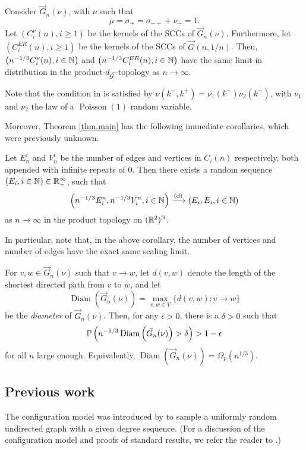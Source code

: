 \begin{theorem}\label{thm.erdosrenyi}
Consider $\vec{G}_n(\nu)$, with $\nu$ such that $$\mu=\sigma_+=\sigma_{-+}+\nu_-=1.$$ 
Let $(C^\nu_i(n), i\geq 1)$ be the kernels of the SCCs of $\vec{G}_n(\nu)$. Furthermore, let $(C^{ER}_i(n), i\geq 1)$ be the kernels of the SCCs of $\vec{G}(n,1/n)$. Then, $\left(n^{-1/3}C^\nu_i(n),i\in \N\right)$ and 
$\left(n^{-1/3}C^{ER}_i(n),i\in \N\right)$ have the same limit in distribution in the product-$d_{\vec{\cG}}$-topology as $n\to \infty$. 
\end{theorem}
Note that the condition in  is satisfied by $\nu(k^-,k^+)=\nu_1(k^-)\nu_2(k^+)$, with $\nu_1$ and $\nu_2$ the law of a $\operatorname{Poisson}(1)$ random variable.

Moreover, Theorem \ref{thm.main} has the following immediate corollaries, which were previously unknown. 
\begin{corollary}\label{cor.componentsizes}
Let $E^i_n$ and $V^i_n$ be the number of edges and vertices in $C_i(n)$ respectively, both appended with infinite repeats of $0$. Then there exists a random sequence $(E_i,i\in \N)\in \R_+^\infty$, such that
$$\left(n^{-1/3}E^n_i,n^{-1/3}V^n_i, i\in \N\right)\todist\left(E_i,E_i,i\in \N\right)$$
as $n\to \infty$ in the product topology on $(\R^2)^{\N}$. 
\end{corollary}
In particular, note that, in the above corollary, the number of vertices and number of edges have the exact same scaling limit.
\begin{corollary}\label{cor.diameter}
For $v,w\in \vec{G}_n(\nu)$ such that $v\to w$, let $d(v,w)$ denote the length of the shortest directed path from $v$ to $w$, and let $$\operatorname{Diam}\left(\vec{G}_n(\nu)\right)=\max_{v,w\in V}\{d(v,w):v\to w\}$$ be the \emph{diameter} of $\vec{G}_n(\nu)$. Then, for any $\epsilon>0$, there is a $\delta>0$ such that $$\P\left( n^{-1/3}\operatorname{Diam}\left(\vec{G}_n(\nu)\right)>\delta\right)>1-\epsilon$$ for all $n$ large enough. Equivalently, $\operatorname{Diam}\left( \vec{G}_n(\nu) \right) = \Omega_p(n^{1/3})$.
\end{corollary}


\subsection{Previous work}\label{sec.previouswork}
The configuration model was introduced by \citet{bollobasProbabilisticProofAsymptotic1980} to sample a uniformly random undirected graph with a given degree sequence. (For a discussion of the configuration model and proofs of standard results, we refer the reader to \cite[Chapter 7]{hofstadRandomGraphsComplex2017}.)

